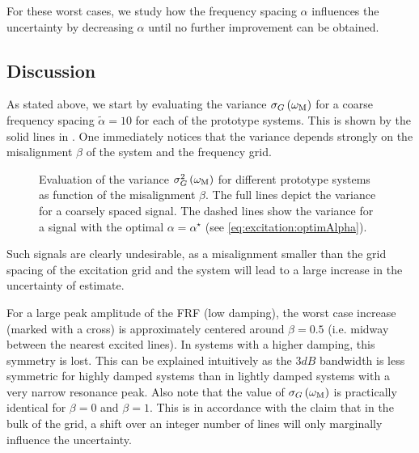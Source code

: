   For these worst cases, we study how the frequency spacing $\alpha$ influences the uncertainty by decreasing $\alpha$ until no further improvement can be obtained.

  \subsection{Discussion} 
  \label{sec:excitation:bestFrequencyResolution}
  As stated above, we start by evaluating the variance $\sigma_G\left( \omega_{\mathrm{M}}\right)$ for a coarse frequency spacing $\tilde{\alpha} = 10$ for each of the prototype systems.
  This is shown by the solid lines in .
  One immediately notices that the variance depends strongly on the misalignment $\beta$ of the system and the frequency grid.
  
  \begin{figure}[pht]
    \centering
      \setlength{}
      \setlength\figureheight{0.68\figurewidth}
    
    \caption[Variance $\sigma_G^2\left( \wM \right)$ as a function of the grid misalignment coefficient $\beta$.]{Evaluation of the variance $\sigma_G^2\left( \wM \right) $ for different prototype systems as function of the misalignment $\beta$.
             The full lines depict the variance for a coarsely spaced signal.
             The dashed lines show the variance for a signal with the optimal $\alpha = \alpha^{\star}$ (see \eqref{eq:excitation:optimAlpha}).}
    \label{fig:excitation:worstCaseBeta}
  \end{figure}

  Such signals are clearly undesirable, as a misalignment smaller than the grid spacing of the excitation grid and the system will lead to a large increase in the uncertainty of estimate.
  
  For a large peak amplitude of the \gls{FRF} (low damping), the worst case increase (marked with a cross) is approximately centered around $\beta = 0.5$ (i.e. midway between the nearest excited lines).
  In systems with a higher damping, this symmetry is lost.
  This can be explained intuitively as the $3\unit{dB}$ bandwidth is less symmetric for highly damped systems than in lightly damped systems with a very narrow resonance peak.
  Also note that the value of $\sigma_G\left(\omega_{\mathrm{M}} \right)$ is practically identical for $\beta=0$ and $\beta=1$.
  This is in accordance with the claim that in the bulk of the grid, a shift over an integer number of lines will only marginally influence the uncertainty.
  
